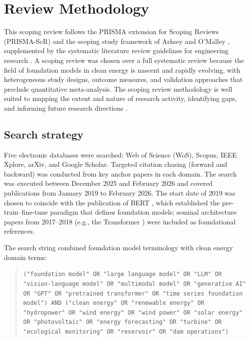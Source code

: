 \documentclass[preprint,12pt]{elsarticle}
\begin{document}
\section{Review Methodology}
\label{sec:methodology}

This scoping review follows the PRISMA extension for Scoping Reviews (PRISMA-ScR) \cite{tricco2018prisma_scr} and the scoping study framework of Arksey and O'Malley \cite{arksey2005scoping}, supplemented by the systematic literature review guidelines for engineering research \cite{kitchenham2007guidelines}. A scoping review was chosen over a full systematic review because the field of foundation models in clean energy is nascent and rapidly evolving, with heterogeneous study designs, outcome measures, and validation approaches that preclude quantitative meta-analysis. The scoping review methodology is well suited to mapping the extent and nature of research activity, identifying gaps, and informing future research directions \cite{page2021prisma}.

\subsection{Search strategy}
\label{subsec:search_strategy}

Five electronic databases were searched: Web of Science (WoS), Scopus, IEEE Xplore, arXiv, and Google Scholar. Targeted citation chasing (forward and backward) was conducted from key anchor papers in each domain. The search was executed between December 2025 and February 2026 and covered publications from January 2019 to February 2026. The start date of 2019 was chosen to coincide with the publication of BERT \cite{devlin2019bert}, which established the pre-train--fine-tune paradigm that defines foundation models; seminal architecture papers from 2017--2018 (e.g., the Transformer \cite{vaswani2017attention}) were included as foundational references.

The search string combined foundation model terminology with clean energy domain terms:

\begin{quote}\small\sloppy
\noindent\texttt{("foundation model" OR "large language model" OR "LLM" OR "vision-language model" OR "multimodal model" OR "generative AI" OR "GPT" OR "pretrained transformer" OR "time series foundation model") AND ("clean energy" OR "renewable energy" OR "hydropower" OR "wind energy" OR "wind power" OR "solar energy" OR "photovoltaic" OR "energy forecasting" OR "turbine" OR "ecological monitoring" OR "reservoir" OR "dam operations")}
\end{quote}
\end{document}
